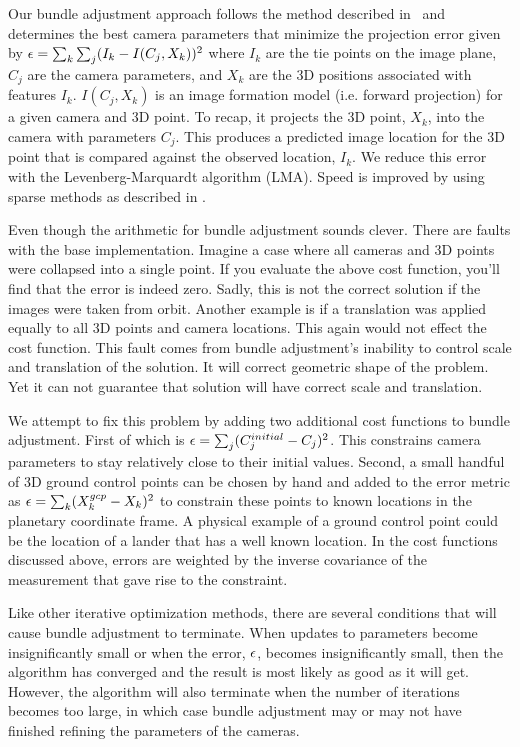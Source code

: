 Our bundle adjustment approach follows the method described
in~\cite{triggs00} and determines the best camera parameters that
minimize the projection error given by ${\bf \epsilon} =
\sum_k\sum_j(I_k-I(C_j, X_k))^2$ where $I_k$ are the tie points on the
image plane, $C_j$ are the camera parameters, and $X_k$ are the 3D
positions associated with features $I_k$. $I(C_j, X_k)$ is an image
formation model (i.e. forward projection) for a given camera and 3D
point. To recap, it projects the 3D point, $X_k$, into the camera with
parameters $C_j$. This produces a predicted image location for the 3D
point that is compared against the observed location, $I_k$. We reduce
this error with the Levenberg-Marquardt algorithm (LMA). Speed is
improved by using sparse methods as described in \citet{hartley04}.

Even though the arithmetic for bundle adjustment sounds clever. There
are faults with the base implementation. Imagine a case where all
cameras and 3D points were collapsed into a single point. If you
evaluate the above cost function, you'll find that the error is indeed
zero. Sadly, this is not the correct solution if the images were taken
from orbit. Another example is if a translation was applied equally to
all 3D points and camera locations. This again would not effect the
cost function. This fault comes from bundle adjustment's inability to
control scale and translation of the solution. It will correct
geometric shape of the problem. Yet it can not guarantee that solution
will have correct scale and translation.

We attempt to fix this problem by adding two additional cost functions
to bundle adjustment. First of which is ${\bf \epsilon} =
\sum_j(C_j^{initial}-C_j)^2$. This constrains camera parameters to
stay relatively close to their initial values. Second, a small handful
of 3D ground control points can be chosen by hand and added to the
error metric as ${\bf \epsilon} = \sum_k(X_k^{gcp}-X_k)^2$ to
constrain these points to known locations in the planetary coordinate
frame. A physical example of a ground control point could be the
location of a lander that has a well known location. In the cost
functions discussed above, errors are weighted by the inverse
covariance of the measurement that gave rise to the constraint.

Like other iterative optimization methods, there are several
conditions that will cause bundle adjustment to terminate.  When
updates to parameters become insignificantly small or when the error,
${\bf \epsilon}$, becomes insignificantly small, then the algorithm
has converged and the result is most likely as good as it will get.
However, the algorithm will also terminate when the number of
iterations becomes too large, in which case bundle adjustment may or
may not have finished refining the parameters of the cameras.

